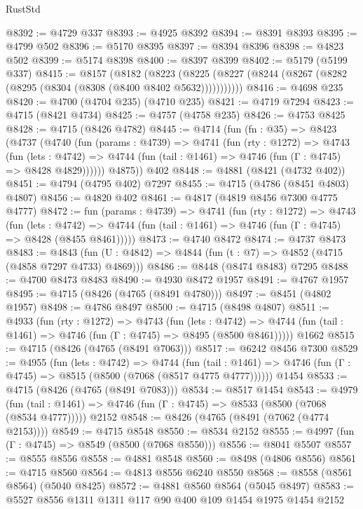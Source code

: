 \begin{lexlean}{RustStd}
\begin{coremodule}
@8392 := @4729 @337
@8393 := @4925 @8392
@8394 := @8391 @8393
@8395 := @4799 @502
@8396 := @5170 @8395
@8397 := @8394 @8396
@8398 := @4823 @502
@8399 := @5174 @8398
@8400 := @8397 @8399
@8402 := @5179 (@5199 @337)
@8415 := @8157
    (@8182
      (@8223 (@8225 (@8227 (@8244 (@8267 (@8282 (@8295 (@8304 (@8308 (@8400 @8402 @5632)))))))))))
@8416 := @4698 @235
@8420 := @4700 (@4704 @235) (@4710 @235)
@8421 := @4719 @7294
@8423 := @4715 (@8421 @4734)
@8425 := @4757 (@4758 @235)
@8426 := @4753 @8425
@8428 := @4715 (@8426 @4782)
@8445 := @4714
    (fun (fn : @35) =>
    @8423
      (@4737
        (@4740
          (fun (params : @4739) =>
          @4741
            (fun (rty : @1272) =>
            @4743
              (fun (lets : @4742) =>
              @4744 (fun (tail : @1461) => @4746 (fun (Γ : @4745) => @8428 @4829))))))
        @4875))
    @402
@8448 := @4881 (@8421 (@4732 @402))
@8451 := @4794 (@4795 @402) @7297
@8455 := @4715 (@4786 (@8451 @4803) @4807)
@8456 := @4820 @402
@8461 := @4817 (@4819 @8456 @7300 @4775 @4777)
@8472 := fun (params : @4739) =>
  @4741
    (fun (rty : @1272) =>
    @4743
      (fun (lets : @4742) =>
      @4744 (fun (tail : @1461) => @4746 (fun (Γ : @4745) => @8428 (@8455 @8461)))))
@8473 := @4740 @8472
@8474 := @4737 @8473
@8483 := @4843 (fun (U : @4842) => @4844 (fun (t : @7) => @4852 (@4715 (@4858 @7297 @4733) @4869)))
@8486 := @8448 (@8474 @8483) @7295
@8488 := @4700 @8473 @8483
@8490 := @4930 @8472 @1957
@8491 := @4767 @1957
@8495 := @4715 (@8426 (@4765 (@8491 @4780)))
@8497 := @8451 (@4802 @1957)
@8498 := @4786 @8497
@8500 := @4715 (@8498 @4807)
@8511 := @4933
    (fun (rty : @1272) =>
    @4743
      (fun (lets : @4742) =>
      @4744 (fun (tail : @1461) => @4746 (fun (Γ : @4745) => @8495 (@8500 @8461)))))
    @1662
@8515 := @4715 (@8426 (@4765 (@8491 @7063)))
@8517 := @6242 @8456 @7300
@8529 := @4955
    (fun (lets : @4742) =>
    @4744
      (fun (tail : @1461) => @4746 (fun (Γ : @4745) => @8515 (@8500 (@7068 (@8517 @4775 @4777))))))
    @1454
@8533 := @4715 (@8426 (@4765 (@8491 @7083)))
@8534 := @8517 @1454
@8543 := @4979
    (fun (tail : @1461) => @4746 (fun (Γ : @4745) => @8533 (@8500 (@7068 (@8534 @4777)))))
    @2152
@8548 := @8426 (@4765 (@8491 (@7062 (@4774 @2153))))
@8549 := @4715 @8548
@8550 := @8534 @2152
@8555 := @4997 (fun (Γ : @4745) => @8549 (@8500 (@7068 @8550)))
@8556 := @8041 @5507
@8557 := @8555 @8556
@8558 := @4881 @8548
@8560 := @8498 (@4806 @8556)
@8561 := @4715 @8560
@8564 := @4813 @8556 @6240 @8550
@8568 := @8558 (@8561 @8564) (@5040 @8425)
@8572 := @4881 @8560 @8564 (@5045 @8497)
@8583 := @5527 @8556 @1311 @1311 @117 @90 @400 @109 @1454 @1975 @1454 @2152

\end{coremodule}
\end{lexlean}
